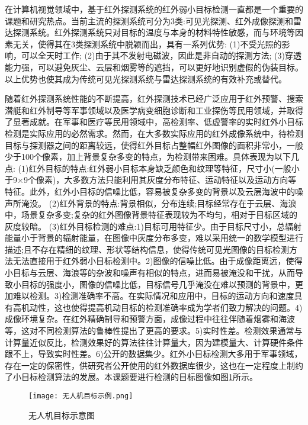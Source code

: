 在计算机视觉领域中，基于红外探测系统的红外弱小目标检测一直都是一个重要的课题和研究热点。当前主流的探测系统可分为3类:可见光探测、红外成像探测和雷达探测系统。红外探测系统只对目标的温度与本身的材料特性敏感，而与环境等因素无关，使得其在3类探测系统中脱颖而出，具有一系列优势:
(1)不受光照的影响，可以全天时工作;
(2)由于其不发射电磁波，因此是非自动的探测方法;
(3)穿透能力强，可以避免灰尘、云层和烟雾等的遮挡，可以更好地识别虚假的伪装目标。以上优势也使其成为传统可见光探测系统与雷达探测系统的有效补充或替代。

随着红外探测系统性能的不断提高，红外探测技术已经广泛应用于红外预警、搜索潜艇和红外制导等军事领域以及医学病变细胞诊断和工业探伤等民用领域，并取得了显著成就。在军事和医疗等民用领域中，高检测率、低虚警率的实时红外小目标检测是实际应用的必然需求。然而，在大多数实际应用的红外成像系统中，待检测目标与探测器之间的距离较远，使得红外目标占整幅红外图像的面积非常小，一般少于100个像素，加上背景复杂多变的特点，为检测带来困难。具体表现为以下几点:
(1)红外目标的特点:红外弱小目标本身缺乏颜色和纹理等特征，尺寸小(一般小于9×9个像素)，大多数方法只能利用其灰度分布特征、运动特征以及运动方向等特征。此外，红外小目标的信噪比低，容易被复杂多变的背景以及云层海波中的噪声所淹没。
(2)红外背景的特点:背景相似，分布连续;目标经常存在于云层、海浪中，场景复杂多变;复杂的红外图像背景特征表现较为不均匀，相对于目标区域的灰度较暗。
(3)红外目标检测的难点:1)目标可用特征少。由于目标尺寸小，总辐射能量小于背景的辐射能量，在图像中灰度分布多变，难以采用统一的数学模型进行描述;且不存在精细的纹理、形状等结构信息，使得传统可见光图像的目标检测方法无法直接用于红外弱小目标检测中。2)图像的信噪比低。由于成像距离远，使得小目标与云层、海浪等的杂波和噪声有相似的特点，进而易被淹没和干扰，从而导致小目标的强度小，图像的信噪比低，目标信号几乎淹没在难以预测的背景中，更加难以检测。3)检测准确率不高。在实际情况和应用中，目标的运动方向和速度具有高机动性，这也使得提高机动目标的检测准确率成为学者们致力解决的问题。4)成像环境复杂。在红外精确制导和预警方面，成像过程中往往伴随着烟雾和海波等，这对不同检测算法的鲁棒性提出了更高的要求。5)实时性差。检测效果通常与计算量近似反比，检测效果好的算法往往计算量大，因为建模量大、计算硬件条件跟不上，导致实时性差。6)公开的数据集少。红外小目标检测大多用于军事领域，存在一定的保密性，供研究者公开使用的红外数据库很少，这也在一定程度上制约了小目标检测算法的发展。本课题要进行检测的目标图像如图\ref{uav}所示。

\begin{figure}[htbp]
    \centering
    \texttt{[image: 无人机目标示例.png]}
    \caption{无人机目标示意图}
    \label{uav}
\end{figure}

